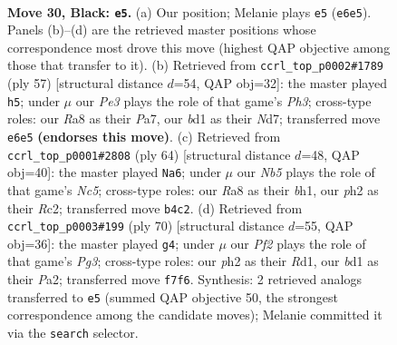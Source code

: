 \documentclass[11pt]{article}
\begin{document}
\clearpage

\begin{figure}[p]\centering
\begin{subfigure}{0.46\textwidth}\centering
\resizebox{\linewidth}{!}{%
\newchessgame
\chessboard[
  setfen={r5k1/4rppp/1n2p3/pb4P1/1n2N3/1P2P2R/P5PP/RN1B3K b - - 10 30},
  showmover=false,
  pgfstyle=straightmove, color=movearrow, markmove={e6-e5}
]}
\caption{}
\end{subfigure}\hfill
\begin{subfigure}{0.46\textwidth}\centering
\resizebox{\linewidth}{!}{%
\newchessgame
\chessboard[
  setfen={4r3/p2n1kp1/2rbp2p/2p5/2Pp1PP1/1P1N4/P2B2KP/R4R2 b - - 0 29},
  showmover=false,
  pgfstyle=straightmove, color=movearrow, markmove={h6-h5}
]}
\caption{}
\end{subfigure}
\\[4pt]
\begin{subfigure}{0.46\textwidth}\centering
\resizebox{\linewidth}{!}{%
\newchessgame
\chessboard[
  setfen={1r6/5pk1/1r2pnp1/2N4p/1p1R1P2/1P4P1/PKR1B2P/7b w - - 12 33},
  showmover=false,
  pgfstyle=straightmove, color=movearrow, markmove={c5-a6}
]}
\caption{}
\end{subfigure}\hfill
\begin{subfigure}{0.46\textwidth}\centering
\resizebox{\linewidth}{!}{%
\newchessgame
\chessboard[
  setfen={8/nk3r2/pp2r2p/2pN1pp1/8/1P3PPP/P2RPK2/3R4 w - - 5 36},
  showmover=false,
  pgfstyle=straightmove, color=movearrow, markmove={g3-g4}
]}
\caption{}
\end{subfigure}
\caption{\textbf{Move 30, Black: \texttt{e5}.} (a) Our position; Melanie plays \texttt{e5} (\texttt{e6e5}). Panels (b)--(d) are the retrieved master positions whose correspondence most drove this move (highest QAP objective among those that transfer to it). (b) Retrieved from \texttt{ccrl\_top\_p0002\#1789} (ply 57) [structural distance $d$=54, QAP obj=32]: the master played \texttt{h5}; under $\mu$ our \emph{Pe3} plays the role of that game's \emph{Ph3}; cross-type roles: our \emph{R}a8 as their \emph{P}a7, our \emph{b}d1 as their \emph{N}d7; transferred move \texttt{e6e5} \textbf{(endorses this move)}. (c) Retrieved from \texttt{ccrl\_top\_p0001\#2808} (ply 64) [structural distance $d$=48, QAP obj=40]: the master played \texttt{Na6}; under $\mu$ our \emph{Nb5} plays the role of that game's \emph{Nc5}; cross-type roles: our \emph{R}a8 as their \emph{b}h1, our \emph{p}h2 as their \emph{R}c2; transferred move \texttt{b4c2}. (d) Retrieved from \texttt{ccrl\_top\_p0003\#199} (ply 70) [structural distance $d$=55, QAP obj=36]: the master played \texttt{g4}; under $\mu$ our \emph{Pf2} plays the role of that game's \emph{Pg3}; cross-type roles: our \emph{p}h2 as their \emph{R}d1, our \emph{b}d1 as their \emph{P}a2; transferred move \texttt{f7f6}. Synthesis: 2 retrieved analogs transferred to \texttt{e5} (summed QAP objective 50, the strongest correspondence among the candidate moves); Melanie committed it via the \texttt{search} selector.}
\label{fig:thought-m59}
\end{figure}
\end{document}
